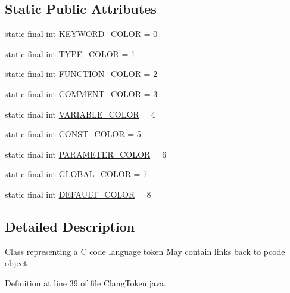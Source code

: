 \subsection*{Static Public Attributes}
\begin{DoxyCompactItemize}
\item 
static final int \mbox{\hyperlink{classghidra_1_1app_1_1decompiler_1_1_clang_token_a2f386d26768178428a64705a8cf93e8b}{K\+E\+Y\+W\+O\+R\+D\+\_\+\+C\+O\+L\+OR}} = 0
\item 
static final int \mbox{\hyperlink{classghidra_1_1app_1_1decompiler_1_1_clang_token_ad00497d88c3b599c1901cddacdf2c6eb}{T\+Y\+P\+E\+\_\+\+C\+O\+L\+OR}} = 1
\item 
static final int \mbox{\hyperlink{classghidra_1_1app_1_1decompiler_1_1_clang_token_a307ac69187f8fbc3370c870097a5fb26}{F\+U\+N\+C\+T\+I\+O\+N\+\_\+\+C\+O\+L\+OR}} = 2
\item 
static final int \mbox{\hyperlink{classghidra_1_1app_1_1decompiler_1_1_clang_token_a68d14dd5965ae639ea4d224c8572d4a2}{C\+O\+M\+M\+E\+N\+T\+\_\+\+C\+O\+L\+OR}} = 3
\item 
static final int \mbox{\hyperlink{classghidra_1_1app_1_1decompiler_1_1_clang_token_aaef3a07a0bdbcbd63609c44a125deb6d}{V\+A\+R\+I\+A\+B\+L\+E\+\_\+\+C\+O\+L\+OR}} = 4
\item 
static final int \mbox{\hyperlink{classghidra_1_1app_1_1decompiler_1_1_clang_token_ad391091e9eacfe6fa662f47eb64cef60}{C\+O\+N\+S\+T\+\_\+\+C\+O\+L\+OR}} = 5
\item 
static final int \mbox{\hyperlink{classghidra_1_1app_1_1decompiler_1_1_clang_token_abe5b8dbf446140708fe1c3e4e5d71f69}{P\+A\+R\+A\+M\+E\+T\+E\+R\+\_\+\+C\+O\+L\+OR}} = 6
\item 
static final int \mbox{\hyperlink{classghidra_1_1app_1_1decompiler_1_1_clang_token_af688747f2ddebafda05d5e77661ff35f}{G\+L\+O\+B\+A\+L\+\_\+\+C\+O\+L\+OR}} = 7
\item 
static final int \mbox{\hyperlink{classghidra_1_1app_1_1decompiler_1_1_clang_token_a42e7824117a5377267507303c3689638}{D\+E\+F\+A\+U\+L\+T\+\_\+\+C\+O\+L\+OR}} = 8
\end{DoxyCompactItemize}


\subsection{Detailed Description}
Class representing a C code language token May contain links back to pcode object 

Definition at line 39 of file Clang\+Token.\+java.



